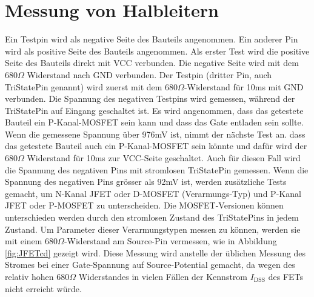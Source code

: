 \section{Messung von Halbleitern}
Ein Testpin wird als negative Seite des Bauteils angenommen.
Ein anderer Pin wird als positive Seite des Bauteils angenommen.
Als erster Test wird die positive Seite des Bauteils direkt mit VCC verbunden.
Die negative Seite wird mit dem \(680\Omega\) Widerstand nach GND verbunden.
Der Testpin (dritter Pin, auch TriStatePin genannt) wird zuerst mit dem \(680\Omega\)-Widerstand
f\"ur 10ms mit GND verbunden.
Die Spannung des negativen Testpins wird gemessen, w\"ahrend der TriStatePin auf Eingang
geschaltet ist.
Es wird angenommen, dass das getestete Bauteil ein P-Kanal-MOSFET sein kann und dass das Gate
entladen sein sollte.
Wenn die gemessene Spannung \"uber 976mV ist, nimmt der n\"achste Test an. dass das getestete
Bauteil auch ein P-Kanal-MOSFET sein k\"onnte und daf\"ur wird der \(680\Omega\) Widerstand
f\"ur 10ms zur VCC-Seite geschaltet.
Auch f\"ur diesen Fall wird die Spannung des negativen Pins mit stromlosen TriStatePin gemessen.
Wenn die Spannung des negativen Pins gr\"osser als 92mV ist, werden zus\"atzliche Tests gemacht, 
um N-Kanal JFET oder D-MOSFET (Verarmungs-Typ) und P-Kanal JFET oder P-MOSFET zu unterscheiden.
Die MOSFET-Versionen k\"onnen unterschieden werden durch den stromlosen Zustand des
TriStatePins in jedem Zustand.
Um Parameter dieser Verarmungstypen messen zu k\"onnen, werden sie mit einem \(680 \Omega\)-Widerstand am
Source-Pin vermessen, wie in Abbildung \ref{fig:JFETcd} gezeigt wird. Diese Messung wird anstelle der
\"ublichen Messung des Stromes bei einer Gate-Spannung auf Source-Potential gemacht, da wegen des
relativ hohen \(680 \Omega\) Widerstandes in vielen F\"allen der Kennstrom \(I_\mathrm{DSS}\) 
des FETs nicht erreicht w\"urde.

